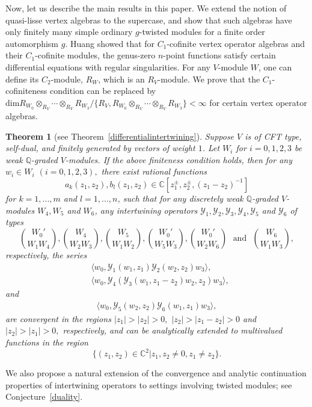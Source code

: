 \documentclass[9pt]{amsart}
\newtheorem{theorem}{Theorem}[section]
\newcommand{\C}{\mathbb{C}}
\begin{document}
Now, let us describe the main results in this paper. We extend the notion of quasi-lisse vertex algebras to the supercase, and show that such algebras have only finitely many simple ordinary $g$-twisted modules for a finite order automorphism $g$.
Huang \cite{huang2005differential1} showed that for $C_1$-cofinite vertex operator algebras and their $C_1$-cofinite modules, the genus-zero $n$-point functions satisfy certain differential equations with regular singularities. For any $V$-module $W$, one can define its $C_2$-module, $R_W$, which is an $R_V$-module. We prove that the $C_1$-cofiniteness condition can be replaced by $\text{dim} R_{W_0}\otimes_{R_V}\cdots \otimes_{R_V} R_{W_3}/\{R_{V},R_{W_0}\otimes_{R_V}\cdots \otimes_{R_V} R_{W_3}\}<\infty$ for certain vertex operator algebras.
\begin{theorem}[see Theorem~\ref{differentialintertwining}]\label{1.1}
Suppose $V$ is of CFT type, self-dual, and finitely generated by vectors of weight $1$.  Let $W_{i}$ for $i=0,1,2,3$ be weak $\mathbb{Q}$-graded $V$-modules. If the above finiteness condition holds,  then for any $w_{i}\in W_{i}$ $(i=0,1,2,3), $ there exist rational functions \[a_{k}(z_{1},z_{2}), b_{l}(z_{1},z_{2})\in \mathbb{C}[z_{1}^{\pm},z_{2}^{\pm},(z_{1}-z_{2})^{-1}]\]
for $k=1,...,m $ and $l=1,...,n$, such that for any discretely weak $\mathbb{Q}$-graded $V$-modules $W_{4},W_{5}$ and $W_{6}$, any intertwining operators $\mathcal{Y}_{1},\mathcal{Y}_{2}, \mathcal{Y}_{3},\mathcal{Y}_{4},\mathcal{Y}_{5}$ and $\mathcal{Y}_{6}$ of types \[\binom{W_{0}'}{W_{1}W_{4}},\binom{W_{4}}{W_{2}W_{3}},\binom{W_{5}}{W_{1}W_{2}},\binom{W_{0}'}{W_{5}W_{3}},\binom{W_{0}'}{W_{2}W_{6}}\,\,\,\, \text{and}\,\,\,\,  \binom{W_{6}}{W_{1}W_{3}},\] respectively, the series
\begin{align}
    &\langle w_{0}, \mathcal{Y}_{1}(w_{1},z_{1})\mathcal{Y}_{2}(w_{2},z_{2})w_{3}\rangle,\\
    &\langle w_{0}, \mathcal{Y}_{4}(\mathcal{Y}_{3}(w_{1},z_{1}-z_{2})w_{2},z_{2})w_{3}\rangle,
\end{align}
and
\begin{align}
    \langle w_{0}, \mathcal{Y}_{5}(w_{2},z_{2})\mathcal{Y}_{6}(w_{1},z_{1})w_{3}\rangle,
\end{align}
are convergent in the regions $|z_{1}|>|z_{2}|>0,$ $|z_{2}|>|z_{1}-z_{2}|>0$ and $|z_{2}|>|z_{1}|>0,$ respectively, and can be analytically extended to multivalued functions in the region
\[\{(z_1,z_2)\in \C^2|z_1,z_2\neq 0,z_1\neq z_2\}.\]
\end{theorem}
We also propose a natural extension of the convergence and analytic continuation properties of intertwining operators to settings involving twisted modules; see Conjecture~\ref{duality}.
\end{document}
